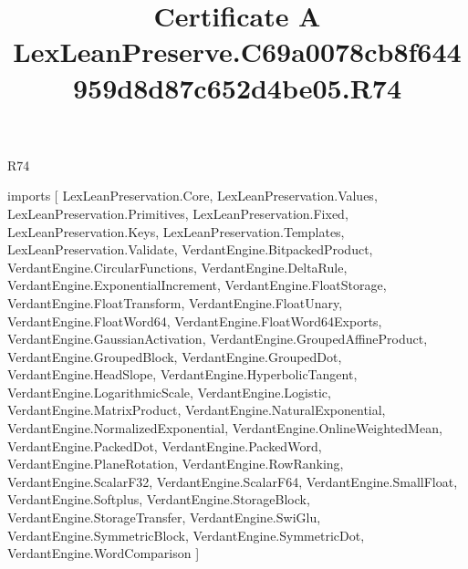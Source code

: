 \begin{lexlean}{R74}
\title{Certificate A LexLeanPreserve.C69a0078cb8f644959d8d87c652d4be05.R74}
\begin{coremodule}
imports [
  LexLeanPreservation.Core,
  LexLeanPreservation.Values,
  LexLeanPreservation.Primitives,
  LexLeanPreservation.Fixed,
  LexLeanPreservation.Keys,
  LexLeanPreservation.Templates,
  LexLeanPreservation.Validate,
  VerdantEngine.BitpackedProduct,
  VerdantEngine.CircularFunctions,
  VerdantEngine.DeltaRule,
  VerdantEngine.ExponentialIncrement,
  VerdantEngine.FloatStorage,
  VerdantEngine.FloatTransform,
  VerdantEngine.FloatUnary,
  VerdantEngine.FloatWord64,
  VerdantEngine.FloatWord64Exports,
  VerdantEngine.GaussianActivation,
  VerdantEngine.GroupedAffineProduct,
  VerdantEngine.GroupedBlock,
  VerdantEngine.GroupedDot,
  VerdantEngine.HeadSlope,
  VerdantEngine.HyperbolicTangent,
  VerdantEngine.LogarithmicScale,
  VerdantEngine.Logistic,
  VerdantEngine.MatrixProduct,
  VerdantEngine.NaturalExponential,
  VerdantEngine.NormalizedExponential,
  VerdantEngine.OnlineWeightedMean,
  VerdantEngine.PackedDot,
  VerdantEngine.PackedWord,
  VerdantEngine.PlaneRotation,
  VerdantEngine.RowRanking,
  VerdantEngine.ScalarF32,
  VerdantEngine.ScalarF64,
  VerdantEngine.SmallFloat,
  VerdantEngine.Softplus,
  VerdantEngine.StorageBlock,
  VerdantEngine.StorageTransfer,
  VerdantEngine.SwiGlu,
  VerdantEngine.SymmetricBlock,
  VerdantEngine.SymmetricDot,
  VerdantEngine.WordComparison
]


\end{coremodule}
\end{lexlean}
